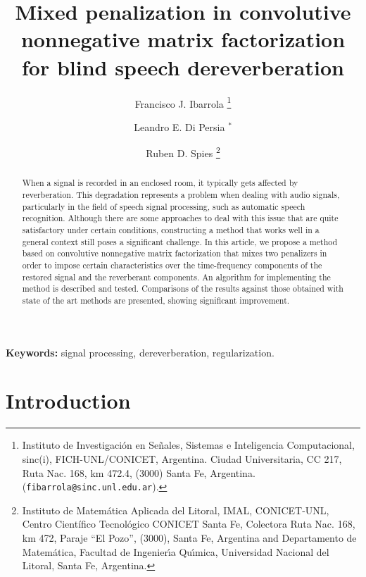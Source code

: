 \documentclass[12pt]{article}
\begin{document}
\title{Mixed penalization in convolutive nonnegative matrix factorization for blind speech dereverberation}

\date{}

\author{
%
Francisco J. Ibarrola
%
\thanks{\footnotesize Instituto de Investigaci\'on en Se\~nales, Sistemas e Inteligencia Computacional, sinc(i), FICH-UNL/CONICET, Argentina. Ciudad Universitaria, CC 217, Ruta Nac. 168, km 472.4, (3000) Santa Fe, Argentina.
({\tt fibarrola@sinc.unl.edu.ar}).}
%
\and Leandro E. Di Persia
$^\ast$
%
\and Ruben D. Spies
%
\thanks{\footnotesize  Instituto de
Matem\'{a}tica Aplicada del Litoral, IMAL, CONICET-UNL, Centro Cient\'ifico Tecnol\'ogico CONICET Santa Fe, Colectora Ruta Nac. 168, km 472, Paraje ``El Pozo'', (3000), Santa Fe, Argentina and Departamento de Matem\'{a}tica, Facultad de Ingenier\'{\i}a Qu\'{\i}mica, Universidad Nacional del Litoral, Santa Fe, Argentina.} 
}


\maketitle

\begin{abstract}
When a signal is recorded in an enclosed room, it typically gets affected by reverberation. This degradation represents a problem when dealing with audio signals, particularly in the field of speech signal processing, such as automatic speech recognition. Although there are some approaches to deal with this issue that are quite satisfactory under certain conditions, constructing a method that works well in a general context still poses a significant challenge. In this article, we propose a method based on convolutive nonnegative matrix factorization that mixes two penalizers in order to impose certain characteristics over the time-frequency components of the restored signal and the reverberant components. An algorithm for implementing the method is described and tested. Comparisons of the results against those obtained with state of the art methods are presented, showing significant improvement.
\end{abstract}

\begin{center}
\small
{\bf Keywords:} signal processing, dereverberation, regularization.
\normalsize
\end{center}



\section{Introduction}
\end{document}
